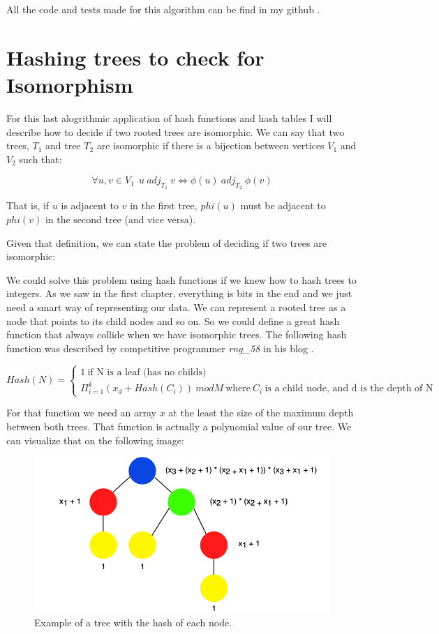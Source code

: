All the code and tests made for this algorithm can be find in my github \cite{GithubRepo}.

\section{Hashing trees to check for Isomorphism}

For this last alogrithmic application of hash functions and hash tables I will describe how to decide if two rooted trees are isomorphic. We can say that two trees,  \( T_1 \) and tree \( T_2 \) are isomorphic if there is a bijection between vertices \(V_1 \) and \(V_2 \) such that:

\[ \forall u, v \in V_1~ ~ u ~adj_{T_1} ~v \iff \phi(u) ~adj_{T_2} ~\phi(v) \]

That is, if \(u \) is adjacent to \( v \) in the first tree, \( phi(u) \) must be adjacent to \( phi(v) \) in the second tree (and vice versa).

Given that definition, we can state the problem of deciding if two trees are isomorphic:

\medskip


\medskip

We could solve this problem using hash functions if we knew how to hash trees to integers. As we saw in the first chapter, everything is bits in the end and we just need a smart way of representing our data. We can represent a rooted tree as a node that points to its child nodes and so on. So we could define a great hash function that always collide when we have isomorphic trees. The following hash function was described by competitive programmer \textit{rng\_58} in his blog \cite{TreeIsomorphism}.


\[ Hash(N) = \begin{cases} 1 ~\text{if N is a leaf (has no childs)} \\
    \Pi_{i = 1}^{k} (x_d + Hash(C_i)) ~mod M ~\text{where} ~C_i ~\text{is a child node, and d is the depth of N}
  \end{cases} \]

For that function we need an array \( x \) at the least the size of the maximum depth between both trees. That function is actually a polynomial value of our tree. We can visualize that on the following image:

\begin{figure}[h!]
  \centering
  \includegraphics[width=12cm]{figuras/treeIsomorphism.png}
  \caption{Example of a tree with the hash of each node. }
\end{figure}
